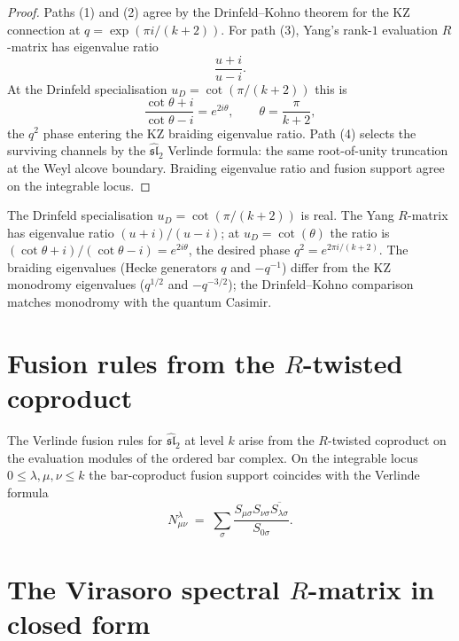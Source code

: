 \begin{proof}
Paths (1) and (2) agree by the Drinfeld--Kohno theorem for the KZ
connection at $q=\exp(\pi i/(k+2))$. For path (3), Yang's rank-$1$
evaluation $R$-matrix has eigenvalue ratio
\[
\frac{u+i}{u-i}.
\]
At the Drinfeld specialisation $u_D=\cot(\pi/(k+2))$ this is
\[
\frac{\cot\theta+i}{\cot\theta-i}=e^{2i\theta},
\qquad \theta=\frac{\pi}{k+2},
\]
the $q^2$ phase entering the KZ braiding eigenvalue ratio. Path
(4) selects the surviving channels by the
$\widehat{\mathfrak{sl}}_2$ Verlinde formula: the same
root-of-unity truncation at the Weyl alcove boundary. Braiding
eigenvalue ratio and fusion support agree on the integrable locus.
\end{proof}

\begin{remark}
\label{rem:dnp-master-drinfeld-real}
The Drinfeld specialisation $u_D = \cot(\pi/(k+2))$ is real. The
Yang $R$-matrix has eigenvalue ratio $(u+i)/(u-i)$; at
$u_D = \cot(\theta)$ the ratio is
$(\cot\theta + i)/(\cot\theta - i) = e^{2i\theta}$, the desired
phase $q^2 = e^{2\pi i/(k+2)}$. The braiding eigenvalues (Hecke
generators $q$ and $-q^{-1}$) differ from the KZ monodromy
eigenvalues ($q^{1/2}$ and $-q^{-3/2}$); the Drinfeld--Kohno
comparison matches monodromy with the quantum Casimir.
\end{remark}

\section{Fusion rules from the $R$-twisted coproduct}
\label{sec:dnp-master-fusion}

The Verlinde fusion rules for $\widehat{\mathfrak{sl}}_2$ at level
$k$ arise from the $R$-twisted coproduct on the evaluation modules
of the ordered bar complex. On the integrable locus
$0\leq \lambda,\mu,\nu\leq k$ the bar-coproduct fusion support
coincides with the Verlinde formula
\[
N^\lambda_{\mu\nu}
\;=\;
\sum_{\sigma}
\frac{S_{\mu\sigma} S_{\nu\sigma} \overline{S_{\lambda\sigma}}}{S_{0\sigma}}.
\]

\section{The Virasoro spectral $R$-matrix in closed form}
\label{sec:dnp-master-virasoro-r}


